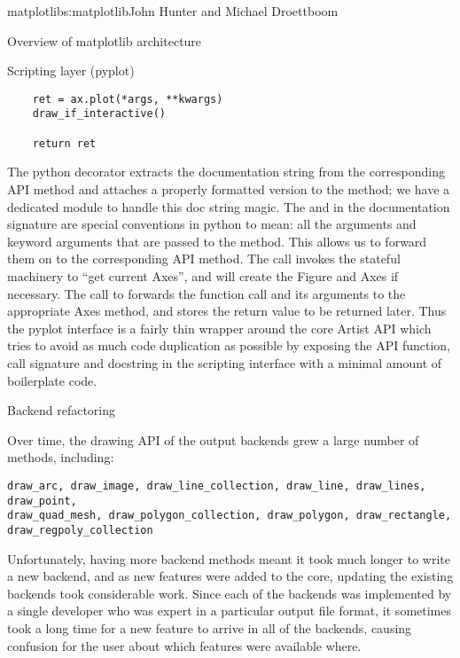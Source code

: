 \begin{aosachapter}{matplotlib}{s:matplotlib}{John Hunter and Michael Droettboom}
\begin{aosasect1}{Overview of matplotlib architecture}
\begin{aosasect2}{Scripting layer (pyplot)}
\begin{verbatim}
    ret = ax.plot(*args, **kwargs)
    draw_if_interactive()

    return ret

\end{verbatim}

The python decorator  extracts
the documentation string from the corresponding API method and
attaches a properly formatted version to the 
method; we have a dedicated module  to
handle this doc string magic.  The  and  in
the documentation signature are special conventions in python to mean:
all the arguments and keyword arguments that are passed to the method.
This allows us to forward them on to the corresponding API method.
The call  invokes the stateful machinery to ``get
current Axes'', and will create the Figure and Axes if necessary.  The
call to  forwards the function
call and its arguments to the appropriate Axes method, and stores the
return value to be returned later.  Thus the pyplot interface is a
fairly thin wrapper around the core Artist API which tries to avoid as
much code duplication as possible by exposing the API function, call
signature and docstring in the scripting interface with a minimal
amount of boilerplate code.


\end{aosasect2}


\end{aosasect1}


\begin{aosasect1}{Backend refactoring}


Over time, the drawing API of the output backends grew a large number
of methods, including:

\begin{verbatim}
draw_arc, draw_image, draw_line_collection, draw_line, draw_lines, draw_point,
draw_quad_mesh, draw_polygon_collection, draw_polygon, draw_rectangle,
draw_regpoly_collection
\end{verbatim}

Unfortunately, having more backend methods meant it took much longer
to write a new backend, and as new features were added to the core,
updating the existing backends took considerable work.  Since each of
the backends was implemented by a single developer who was expert in a
particular output file format, it sometimes took a long time for a new
feature to arrive in all of the backends, causing confusion for the
user about which features were available where.


\end{aosasect1}
\end{aosachapter}
